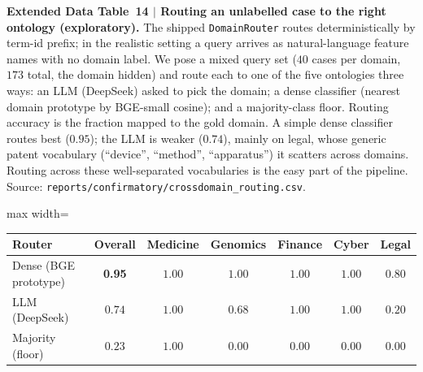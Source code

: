 \documentclass[pdflatex,sn-nature]{sn-jnl}
\newcommand{\edcaption}[1]{\par{\small #1}\par\smallskip}
\begin{document}
\begin{appendices}

\begin{table}[htbp]
\centering
\edcaption{\textbf{Extended Data Table~14 $|$ Routing an unlabelled case to the
    right ontology (exploratory).}
  The shipped \texttt{DomainRouter} routes deterministically by term-id prefix; in
  the realistic setting a query arrives as natural-language feature names with no
  domain label. We pose a mixed query set ($40$ cases per domain, $173$ total, the
  domain hidden) and route each to one of the five ontologies three ways: an LLM
  (DeepSeek) asked to pick the domain; a dense classifier (nearest domain prototype
  by BGE-small cosine); and a majority-class floor. Routing accuracy is the
  fraction mapped to the gold domain. A simple dense classifier routes best
  ($0.95$); the LLM is weaker ($0.74$), mainly on legal, whose generic patent
  vocabulary (``device'', ``method'', ``apparatus'') it scatters across domains.
  Routing across these well-separated vocabularies is the easy part of the
  pipeline. Source: \texttt{reports/confirmatory/crossdomain\_routing.csv}.}
\small
\setlength{\tabcolsep}{6pt}
\begin{adjustbox}{max width=\textwidth}
\begin{tabular}{lcccccc}
\toprule
\textbf{Router} & \textbf{Overall} & \textbf{Medicine} & \textbf{Genomics} &
    \textbf{Finance} & \textbf{Cyber} & \textbf{Legal} \\
\midrule
\rowcolor{smarow}Dense (BGE prototype) & \textbf{0.95} & $1.00$ & $1.00$ & $1.00$ & $1.00$ & $0.80$ \\
LLM (DeepSeek)        & $0.74$ & $1.00$ & $0.68$ & $1.00$ & $1.00$ & $0.20$ \\
Majority (floor)      & $0.23$ & $1.00$ & $0.00$ & $0.00$ & $0.00$ & $0.00$ \\
\bottomrule
\end{tabular}
\end{adjustbox}
\label{tab:ed14_routing}
\end{table}




\end{appendices}
\end{document}
